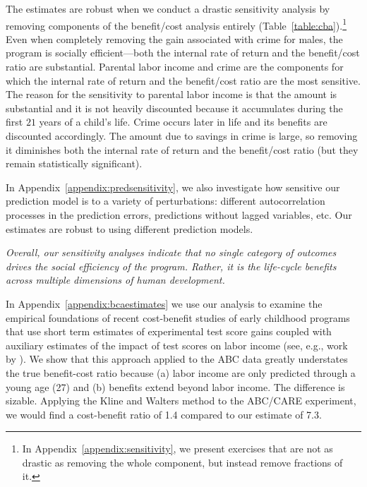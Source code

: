 The estimates are robust when we conduct a drastic sensitivity analysis by removing components of the benefit/cost analysis entirely (Table~\ref{table:cba}).\footnote{In  Appendix~\ref{appendix:sensitivity}, we present exercises that are not as drastic as removing the whole component, but instead remove fractions of it.} Even when completely removing the gain associated with crime for males, the program is socially efficient---both the internal rate of return and the benefit/cost ratio are substantial. Parental labor income and crime are the components for which the internal rate of return and the benefit/cost ratio are the most sensitive. The reason for the sensitivity to parental labor income is that the amount is substantial and it is not heavily discounted because it accumulates during the first $21$ years of a child's life. Crime occurs later in life and its benefits are discounted accordingly. The amount due to savings in crime is large, so removing it diminishes both the internal rate of return and the benefit/cost ratio (but they remain statistically significant).

In  Appendix~\ref{appendix:predsensitivity}, we also investigate how sensitive our prediction model is to a variety of perturbations: different autocorrelation processes in the prediction errors, predictions without lagged variables, etc. Our estimates are robust to using different prediction models.

\textit{Overall, our sensitivity analyses indicate that no single category of outcomes drives the social efficiency of the program. Rather, it is the life-cycle benefits across multiple dimensions of human development.}

In  Appendix~\ref{appendix:bcaestimates} we use our analysis to examine the empirical foundations of recent cost-benefit studies of early childhood programs that use short term estimates of experimental test score gains coupled with auxiliary estimates of the impact of test scores on labor income (see, e.g., work by \citealp{Kline_Walters_2016_QJE}). We show that this approach applied to the ABC data greatly understates the true benefit-cost ratio because (a) labor income are only predicted through a young age (27) and (b) benefits extend beyond labor income. The difference is sizable. Applying the Kline and Walters method to the ABC/CARE experiment, we would find a cost-benefit ratio of 1.4 compared to our estimate of 7.3.

